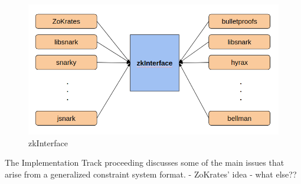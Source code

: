 \documentclass[a4paper,11pt]{article}
\begin{document}
		\begin{figure}[h!]
			\includegraphics[width=\linewidth]{interface.png}
			\caption{zkInterface}
			\label{interface}
		\end{figure}
		
		The Implementation Track proceeding discusses some of the main issues that arise from a generalized constraint system format. 
		- ZoKrates' idea
		- what else??
		
		
		
		
		
	
\end{document}
